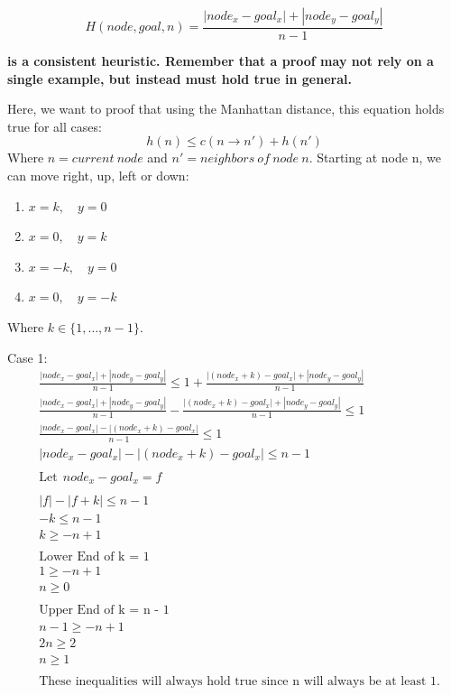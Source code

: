 \documentclass[a4paper]{article}
\begin{document}
\begin{sloppypar}
\begin{enumerate}[start=6,label=Q\arabic*,left=0pt]
    \[ H(node, goal, n) = \frac{|node_x - goal_x| + |node_y - goal_y|}{n - 1} \]

    \textbf{is a consistent heuristic. Remember that a proof may not rely on a single example, but instead must hold true in general.}
    
    \par Here, we want to proof that using the Manhattan distance, this equation holds true for all cases:
    \[ h(n) \leq c(n \rightarrow n') + h(n') \]
    Where $n = current\:node$ and $n' = neighbors\:of\:node\:n$. Starting at node n, we can move right, up, left or down:
    \begin{enumerate}[start=1,label=\arabic*.,left=0pt]
        \item $ x = k, \quad y = 0 $
        \item $ x = 0, \quad y = k $ 
        \item $ x = -k, \quad y = 0 $
        \item $ x = 0, \quad y = -k $
    \end{enumerate}

    Where $ k \in \{1, \ldots, n-1\} $.

    Case 1:
    \begin{align*}
        &\frac{|node_x - goal_x| + |node_y - goal_y|}{n - 1} \leq 1 + \frac{|(node_x + k) - goal_x| + |node_y - goal_y|}{n - 1} \\
        &\frac{|node_x - goal_x| + |node_y - goal_y|}{n - 1} - \frac{|(node_x + k) - goal_x| + |node_y - goal_y|}{n - 1} \leq 1 \\
        &\frac{|node_x - goal_x| - |(node_x + k) - goal_x|}{n - 1} \leq 1 \\
        &|node_x - goal_x| - |(node_x + k) - goal_x| \leq n - 1 \\\\
        &\text{Let} \:\: node_x - goal_x = f \\\\
        &|f| - |f + k| \leq n - 1 \\
        &-k \leq n - 1 \\
        &k \geq -n + 1 \\\\
        &\text{Lower End of k = 1} \\
        &1 \geq -n + 1 \\
        &n \geq 0 \\\\
        &\text{Upper End of k = n - 1} \\
        &n - 1 \geq -n + 1 \\
        &2n \geq 2 \\
        &n \geq 1 \\\\
        &\text{These inequalities will always hold true since n will always be at least 1.}
    \end{align*}


\end{enumerate}
\end{sloppypar}
\end{document}
